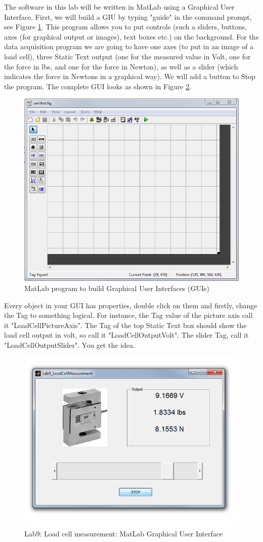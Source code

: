 \documentclass[12pt,letterpaper]{article}
\begin{document}
The software in this lab will be written in MatLab using a Graphical User Interface. First, we will build a GIU by typing "guide" in the command prompt, see Figure \ref{fig:Lab9_LoadCellMeasurementGUIDE}. This program allows you to put controls (such a sliders, buttons, axes (for graphical output or images), text boxes etc.) on the background. For the data acquisition program we are going to have one axes (to put in an image of a load cell), three Static Text output (one for the measured value in Volt, one for the force in lbs, and one for the force in Newton), as well as a slider (which indicates the force in Newtons in a graphical way). We will add a button to Stop the program. The complete GUI looks as shown in Figure \ref{fig:Lab9_LoadCellMeasurementGUI}.

\begin{figure}
\centering
\includegraphics[width=0.8\linewidth]{Lab9_LoadCellMeasurementGUIDE}
\caption{MatLab program to build Graphical User Interfaces (GUIs)}
\label{fig:Lab9_LoadCellMeasurementGUIDE}
\end{figure}

Every object in your GUI has properties, double click on them and firstly, change the Tag to something logical. For instance, the Tag value of the picture axis call it "LoadCellPictureAxis". The Tag of the top Static Text box should show the load cell output in volt, so call it "LoadCellOutputVolt". The slider Tag, call it "LoadCellOutputSlider". You get the idea.

\begin{figure}
\centering
\includegraphics[width=0.6\linewidth]{Lab9_LoadCellMeasurementGUI}
\caption{Lab9: Load cell measurement: MatLab Graphical User Interface}
\label{fig:Lab9_LoadCellMeasurementGUI}
\end{figure}
\end{document}
